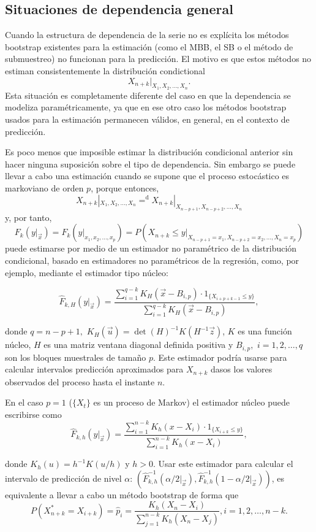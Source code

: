 \documentclass[]{book}
\theoremstyle{definition}
\theoremstyle{definition}
\theoremstyle{definition}
\theoremstyle{remark}
\begin{document}
\subsection{Situaciones de dependencia
general}\label{situaciones-de-dependencia-general-2}

Cuando la estructura de dependencia de la serie no es explícita los
métodos bootstrap existentes para la estimación (como el MBB, el SB o el
método de submuestreo) no funcionan para la predicción. El motivo es que
estos métodos no estiman consistentemente la distribución condictional
\[X_{n+k}|_{X_1,X_2,\ldots ,X_n}.\] Esta situación es completamente
diferente del caso en que la dependencia se modeliza paramétricamente,
ya que en ese otro caso los métodos bootstrap usados para la estimación
permanecen válidos, en general, en el contexto de predicción.

Es poco menos que imposible estimar la distribución condicional anterior
sin hacer ninguna suposición sobre el tipo de dependencia. Sin embargo
se puede llevar a cabo una estimación cuando se supone que el proceso
estocástico es markoviano de orden \(p\), porque entonces,
\[X_{n+k}|_{X_1,X_2,\ldots ,X_n}{=}^{\mathrm{d}
}X_{n+k}|_{X_{n-p+1},X_{n-p+2},\ldots ,X_n}\]y, por tanto,
\[F_{k}(y|_{\vec{x}})=F_{k}(y|_{x_1,x_2,\ldots ,x_{p}})=P\left(
X_{n+k}\leq y|_{X_{n-p+1}=x_1,X_{n-p+2}=x_2,\ldots ,X_n=x_{p}} \right)\]puede
estimarse por medio de un estimador no paramétrico de la distribución
condicional, basado en estimadores no paramétricos de la regresión,
como, por ejemplo, mediante el estimador tipo núcleo:

\[\widehat{F}_{k,H}(y|_{\vec{x}})=\frac{\sum_{i=1}^{q-k}K_{H}(\vec{x}
-B_{i,p})\cdot 1_{\{X_{i+p+k-1}\leq y\}}}{\sum_{i=1}^{q-k}K_{H}(\vec{x}
-B_{i,p})},\]

donde \(q=n-p+1,\) \(K_{H}(\vec{u})=\det (H)^{-1}K(H^{-1}\vec{z})\),
\(K\) es una función núcleo, \(H\) es una matriz ventana diagonal
definida positiva y \(B_{i,p},\) \(i=1,2,\ldots ,q\) son los bloques
muestrales de tamaño \(p\). Este estimador podría usarse para calcular
intervalos predicción aproximados para \(X_{n+k}\) dasos los valores
observados del proceso hasta el instante \(n\).

En el caso \(p=1\) (\(\{X_{t}\}\) es un proceso de Markov) el estimador
núcleo puede escribirse
como\[\widehat{F}_{k,h}(y|_{\vec{x}})=\frac{\sum_{i=1}^{n-k}K_{h}(x-X_i)\cdot
1_{\{X_{i+k}\leq y\}}}{\sum_{i=1}^{n-k}K_{h}(x-X_i)},\]

donde \(K_{h}(u)=h^{-1}K(u/h)\) y \(h>0\). Usar este estimador para
calcular el intervalo de predicción de nivel \(\alpha\):
\(\left( \widehat{F} _{k,h}^{-1}(\alpha /2|_{\vec{x}}),\widehat{F}_{k,h}^{-1}(1-\alpha /2|_{\vec{x }}) \right)\),
es equivalente a llevar a cabo un método bootstrap de forma
que\[P\left( X_{n+k}^{\ast}=X_{i+k} \right) =\widehat{p}_i=\frac{
K_{h}(X_n-X_i)}{\sum_{j=1}^{n-k}K_{h}(X_n-X_j)}\mathrm{,}
i=1,2,\ldots ,n-k.\]
\end{document}

